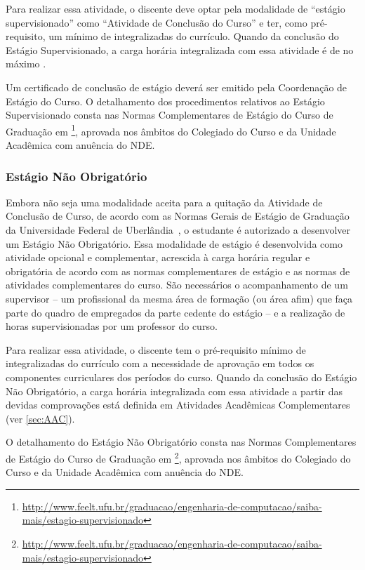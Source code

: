 Para realizar essa atividade, o discente deve optar pela modalidade de ``estágio supervisionado'' como ``Atividade de Conclusão do Curso'' e ter, como pré-requisito, um mínimo de integralizadas do currículo. Quando da conclusão do Estágio Supervisionado, a carga horária integralizada com essa atividade é de no máximo \unskip.

Um certificado de conclusão de estágio deverá ser emitido pela Coordenação de Estágio do Curso. O detalhamento dos procedimentos relativos ao Estágio Supervisionado consta nas Normas Complementares de Estágio do Curso de Graduação em \nomecursonovo\footnote{\url{http://www.feelt.ufu.br/graduacao/engenharia-de-computacao/saiba-mais/estagio-supervisionado}}, aprovada nos âmbitos do Colegiado do Curso e da Unidade Acadêmica com anuência do NDE.

\subsubsection{Estágio Não Obrigatório}

Embora não seja uma modalidade aceita para a quitação da Atividade de Conclusão de Curso, de acordo com as Normas Gerais de Estágio de Graduação da Universidade Federal de Uberlândia~\cite{UFU:CONGRAD:93:2023}, o estudante é autorizado a desenvolver um Estágio Não Obrigatório. Essa modalidade de estágio é desenvolvida como atividade opcional e complementar, acrescida à carga horária regular e obrigatória de acordo com as normas complementares de estágio e as normas de atividades complementares do curso. São necessários o acompanhamento de um supervisor -- um profissional da mesma área de formação (ou área afim) que faça parte do quadro de empregados da parte cedente do estágio -- e a realização de horas supervisionadas por um professor do curso.

Para realizar essa atividade, o discente tem o pré-requisito mínimo de integralizadas do currículo com a necessidade de aprovação em todos os componentes curriculares dos períodos do curso. Quando da conclusão do Estágio Não Obrigatório, a carga horária integralizada com essa atividade a partir das devidas comprovações está definida em Atividades Acadêmicas Complementares (ver \autoref{sec:AAC}).

O detalhamento do Estágio Não Obrigatório consta nas Normas Complementares de Estágio do Curso de Graduação em \nomecursonovo\footnote{\url{http://www.feelt.ufu.br/graduacao/engenharia-de-computacao/saiba-mais/estagio-supervisionado}}, aprovada nos âmbitos do Colegiado do Curso e da Unidade Acadêmica com anuência do NDE.


